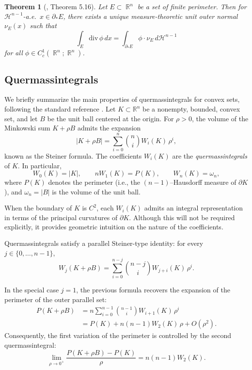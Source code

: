 \documentclass[oneside,a4paper,11pt,notitlepage]{article}
\theoremstyle{plain}
\newtheorem{teor}{Theorem}
\numberwithin{teor}{section}
\numberwithin{equation}{section}
\newenvironment{teorema}{\begin{teor}}{\end{teor}}
\theoremstyle{definition}
\theoremstyle{plain}
\theoremstyle{plain}
\theoremstyle{plain}
\theoremstyle{plain}
\theoremstyle{definition}
\theoremstyle{definition}
\theoremstyle{plain}
\DeclareMathOperator{\R}{\mathbb{R}}
\begin{document}
\begin{teorema}[\cite{evansgar}, Theorem 5.16]
    Let $E \subset \R^n$ be a set of finite perimeter. Then for $\mathcal{H}^{n-1}$-a.e.\ $x \in \partial_\ast E$, there exists a unique measure-theoretic unit outer normal $\nu_E(x)$ such that
    \[
        \int_E \mathrm{div}\, \phi \, dx = \int_{\partial_\ast E} \phi \cdot \nu_E \, d\mathcal{H}^{n-1}
    \]
    for all $\phi \in C_c^1(\R^n;\R^n)$.
\end{teorema}

\subsection{Quermassintegrals}
We briefly summarize the main properties of quermassintegrals for convex sets,
following the standard reference \cite{Schneider_2013}. Let $K \subset \mathbb{R}^n$
be a nonempty, bounded, convex set, and let $B$ be the unit ball centered at the
origin. For $\rho>0$, the volume of the Minkowski sum $K+\rho B$ admits the
expansion
\begin{equation}
\label{Steiner_formula}
|K + \rho B| = \sum_{i=0}^n \binom{n}{i} W_i(K)\, \rho^i,
\end{equation}
known as the Steiner formula. The coefficients $W_i(K)$ are the
\emph{quermassintegrals} of $K$. In particular,
\[
W_0(K)=|K|, \qquad n W_1(K)=P(K), \qquad W_n(K)=\omega_n,
\]
where $P(K)$ denotes the perimeter (i.e., the $(n-1)$–Hausdorff measure of
$\partial K$), and $\omega_n = |B|$ is the volume of the unit ball.

When the boundary of $K$ is $C^2$, each $W_i(K)$ admits an integral
representation in terms of the principal curvatures of $\partial K$. Although this
will not be required explicitly, it provides geometric intuition on the nature of
the coefficients.

Quermassintegrals satisfy a parallel Steiner-type identity:
for every $j \in \{0,\dots,n-1\}$,
\begin{equation}
\label{Steiner_quermass}
W_j(K+\rho B) = \sum_{i=0}^{n-j} \binom{n-j}{i} W_{j+i}(K)\, \rho^i.
\end{equation}

In the special case $j=1$, the previous formula recovers the expansion of the
perimeter of the outer parallel set:
\begin{align*}
P(K+\rho B) &= n \sum_{i=0}^{n-1} \binom{n-1}{i} W_{i+1}(K)\, \rho^i \\[1.2ex]
&= P(K) + n(n-1) W_2(K)\, \rho + O(\rho^2).
\end{align*}
Consequently, the first variation of the perimeter is controlled by the second
quermassintegral:
\begin{equation}
\label{derivata_perimetro}
\lim_{\rho \to 0^+} \frac{P(K+\rho B) - P(K)}{\rho} = n(n-1) W_2(K).
\end{equation}
\end{document}

